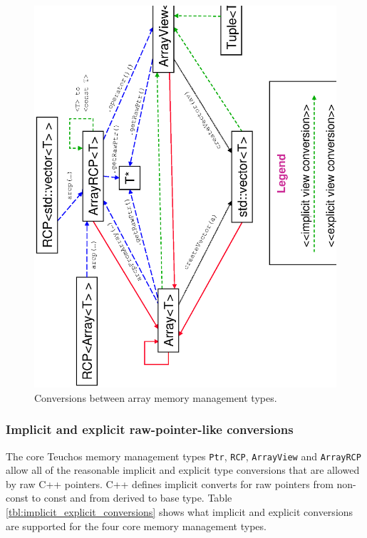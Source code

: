 \documentclass[pdf,ps2pdf,11pt]{SANDreport}
\begin{document}
{\bsinglespace
\begin{figure}[p]
\begin{center}
\includegraphics*[angle=270,scale=0.50]{TeuchosArrayConversions}
\end{center}
\caption{
\label{fig:TeuchosArrayConversions}
Conversions between array memory management types.  }
\end{figure}
\esinglespace}


%
{}\subsubsection{Implicit and explicit raw-pointer-like conversions}
\label{sec:raw-pointer-like-type-conversions}
%

The core Teuchos memory management types {}\texttt{Ptr},
{}\texttt{RCP}, {}\texttt{ArrayView} and {}\texttt{ArrayRCP} allow all
of the reasonable implicit and explicit type conversions that are
allowed by raw C++ pointers.  C++ defines implicit converts for raw
pointers from non-const to const and from derived to base type.  Table
{}\ref{tbl:implicit_explicit_conversions} shows what implicit and
explicit conversions are supported for the four core memory management
types.
\end{document}
